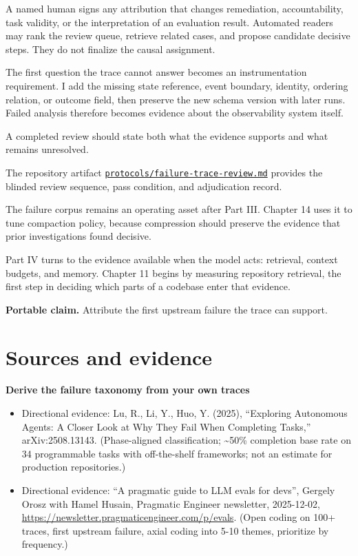 A named human signs any attribution that changes remediation, accountability, task validity, or the interpretation of an evaluation result. Automated readers may rank the review queue, retrieve related cases, and propose candidate decisive steps. They do not finalize the causal assignment.

The first question the trace cannot answer becomes an instrumentation requirement. I add the missing state reference, event boundary, identity, ordering relation, or outcome field, then preserve the new schema version with later runs. Failed analysis therefore becomes evidence about the observability system itself.

A completed review should state both what the evidence supports and what remains unresolved.

The repository artifact \href{https://github.com/sjarmak/engineering-reliable-coding-agents/blob/main/protocols/failure-trace-review.md}{\texttt{protocols/failure-trace-review.md}} provides the blinded review sequence, pass condition, and adjudication record.

The failure corpus remains an operating asset after Part III. Chapter 14 uses it to tune compaction policy, because compression should preserve the evidence that prior investigations found decisive.

Part IV turns to the evidence available when the model acts: retrieval, context budgets, and memory. Chapter 11 begins by measuring repository retrieval, the first step in deciding which parts of a codebase enter that evidence.

\textbf{Portable claim.} Attribute the first upstream failure the trace can support.

\section*{Sources and evidence}

\textbf{Derive the failure taxonomy from your own traces}

\begin{itemize}
\tightlist
\item
  Directional evidence: Lu, R., Li, Y., Huo, Y. (2025), ``Exploring Autonomous Agents: A Closer Look at Why They Fail When Completing Tasks,'' arXiv:2508.13143. (Phase-aligned classification; \textasciitilde50\% completion base rate on 34 programmable tasks with off-the-shelf frameworks; not an estimate for production repositories.)
\item
  Directional evidence: ``A pragmatic guide to LLM evals for devs'', Gergely Orosz with Hamel Husain, Pragmatic Engineer newsletter, 2025-12-02, \url{https://newsletter.pragmaticengineer.com/p/evals}. (Open coding on 100+ traces, first upstream failure, axial coding into 5-10 themes, prioritize by frequency.)
\end{itemize}

